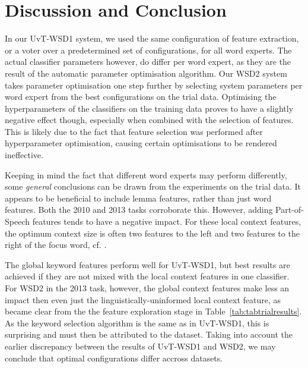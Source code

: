 \section{Discussion and Conclusion}




In our UvT-WSD1 system, we used the same configuration of feature extraction,
or a voter over a predetermined set of configurations, for all word experts. The actual
classifier parameters however, do differ per word expert, as they are the
result of the automatic parameter optimisation algorithm. Our WSD2 system
takes parameter optimisation one step further by selecting system parameters
per word expert from the best configurations on the trial data. Optimising the
hyperparameters of the classifiers on the training data proves to have a
slightly negative effect though, especially when combined with the selection of
features. This is likely due to the fact that feature selection was performed
after hyperparameter optimisation, causing certain optimisations to be rendered
ineffective.

Keeping in mind the fact that different word experts may perform differently,
some \emph{general} conclusions can be drawn from the experiments on the trial
data. It appears to be beneficial to include lemma features, rather than just
word features. Both the 2010 and 2013 tasks corroborate this. However, adding
Part-of-Speech features tends to have a negative impact. For these local
context features, the optimum context size is often two features to the left
and two features to the right of the focus word, cf.  \citep{Hendrickx+02}.

The global keyword features perform well for UvT-WSD1, but best results are
achieved if they are not mixed with the local context features in one
classifier. For WSD2 in the 2013 task, however, the global context features
make less an impact then even just the linguistically-uninformed local context
feature, as became clear from the the feature exploration stage in
Table~\ref{tab:tabtrialresults}. As the keyword selection algorithm is the same
as in UvT-WSD1, this is surprising and must then be attributed to the dataset.
Taking into account the earlier discrepancy between the results of UvT-WSD1 and
WSD2, we may conclude that optimal configurations differ accross datasets.


